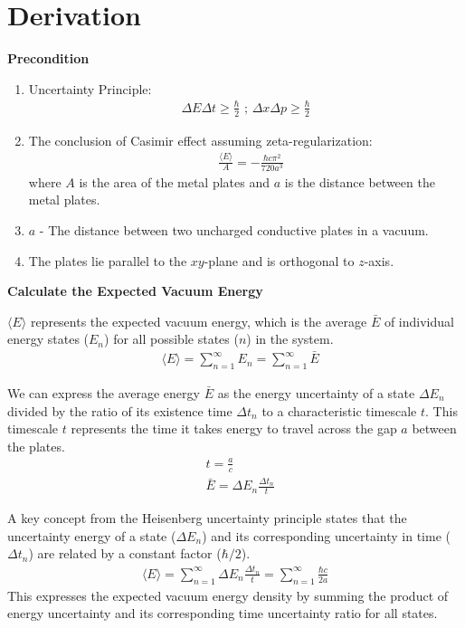 \section{Derivation}

\noindent\textbf{Precondition}


\begin{enumerate}
    \item Uncertainty Principle\citep*{heisenberg1930physical}:
        \begin{align}
            \Delta E \Delta t \ge \frac{\hbar}{2}\text{ ;  } \Delta x \Delta p \ge \frac{\hbar}{2}
        \end{align}
    \item The conclusion of Casimir effect assuming zeta-regularization\citep*{Casimir:1948dh}: 
    \begin{align}&\frac{\langle E \rangle}{A} = -\frac{\hbar c \pi^2}{720 a^3}\end{align}
    where \(A\) is the area of the metal plates and $a$ is the distance between the metal plates.
    \item $a$ - The distance between two uncharged conductive plates in a vacuum.
    \item The plates lie parallel to the \(xy\)-plane and is orthogonal to \(z\)-axis.
\end{enumerate}

\noindent\textbf{Calculate the Expected Vacuum Energy}


$\langle E \rangle$ represents the expected vacuum energy, 
which is the average $\bar E$ of individual energy states ($E_n$) for all possible states ($n$) in the system.
\begin{align}
    &\langle E \rangle = \sum_{n=1}^{\infty}E_n = \sum_{n=1}^{\infty}\bar{E}
\end{align}

We can express the average energy $\bar E$ as the energy uncertainty of 
a state $\Delta E_n$ divided by the ratio of its existence time $\Delta t_n$ 
to a characteristic timescale $t$.
This timescale $t$ represents the time it takes energy to travel across the gap $a$ between the plates.
\begin{align}
    &t = \frac{a}{c} \\
    &\bar{E} = \Delta E_n\frac{\Delta t_n}{t}
\end{align}

A key concept from the Heisenberg uncertainty principle states that 
the uncertainty energy of a state ($\Delta E_n$) and its corresponding uncertainty in time ($\Delta t_n$) are 
related by a constant factor ($\hbar/2$).
\begin{align}
    \langle E \rangle = \sum_{n=1}^{\infty} \Delta E_n \frac{\Delta t_n}{t} = \sum_{n=1}^{\infty} \frac{\hbar c }{2 a}
\end{align}
This expresses the expected vacuum energy density by summing 
the product of energy uncertainty and its corresponding time uncertainty ratio for all states.\\

